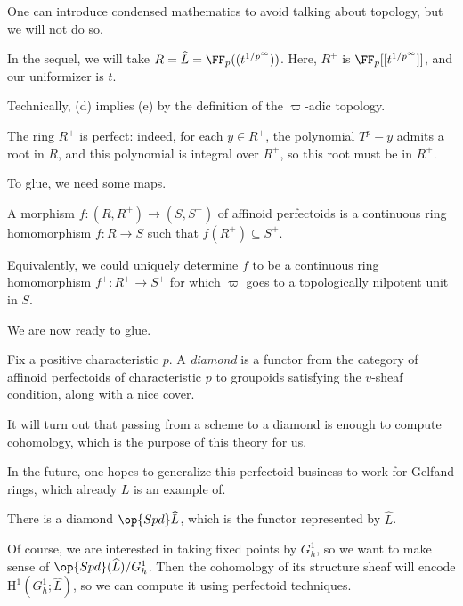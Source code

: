 \documentclass[../notes.tex]{subfiles}
\begin{document}
\begin{remark}
	One can introduce condensed mathematics to avoid talking about topology, but we will not do so.
\end{remark}
\begin{example}
	In the sequel, we will take $R=\widehat L=\FF_p((t^{1/p^\infty}))$. Here, $R^+$ is $\FF_p[[t^{1/p^\infty}]]$, and our uniformizer is $t$.
\end{example}
\begin{remark}
	Technically, (d) implies (e) by the definition of the $\varpi$-adic topology.
\end{remark}
\begin{remark}
	The ring $R^+$ is perfect: indeed, for each $y\in R^+$, the polynomial $T^p-y$ admits a root in $R$, and this polynomial is integral over $R^+$, so this root must be in $R^+$.
\end{remark}
To glue, we need some maps.
\begin{definition}
	A morphism $f\colon(R,R^+)\to(S,S^+)$ of affinoid perfectoids is a continuous ring homomorphism $f\colon R\to S$ such that $f(R^+)\subseteq S^+$.
\end{definition}
\begin{remark}
	Equivalently, we could uniquely determine $f$ to be a continuous ring homomorphism $f^+\colon R^+\to S^+$ for which $\varpi$ goes to a topologically nilpotent unit in $S$.
\end{remark}
We are now ready to glue.
\begin{definition}[diamond]
	Fix a positive characteristic $p$. A \textit{diamond} is a functor from the category of affinoid perfectoids of characteristic $p$ to groupoids satisfying the $v$-sheaf condition, along with a nice cover.
\end{definition}
It will turn out that passing from a scheme to a diamond is enough to compute cohomology, which is the purpose of this theory for us.
\begin{remark}
	In the future, one hopes to generalize this perfectoid business to work for Gelfand rings, which already $L$ is an example of.
\end{remark}
\begin{example}
	There is a diamond $\op{Spd}\widehat L$, which is the functor represented by $\widehat L$.
\end{example}
Of course, we are interested in taking fixed points by $G_h^1$, so we want to make sense of $\op{Spd}(\widehat L)/G_h^1$. Then the cohomology of its structure sheaf will encode $\mathrm H^1(G_h^1;\widehat L)$, so we can compute it using perfectoid techniques.
\end{document}
